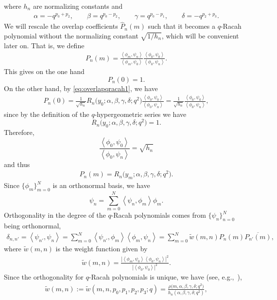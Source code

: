 \documentclass[10pt,a4paper]{amsart}
\numberwithin{equation}{section}
\newcommand{\inprod}[2]{\left\langle #1, #2 \right\rangle}
\begin{document}
where $h_n$ are normalizing constants and
\begin{gather}
	\alpha=-q^{p_0+p_2},\qquad \beta=q^{p_0-p_2},\qquad \gamma=q^{p_0-p_1},\qquad \delta=-q^{p_2+p_3}. \label{eq:qracahpar}
\end{gather}
We will rescale the overlap coefficients $\widehat{P}_n(m)$ such that it becomes a $q$-Racah polynomial without the normalizing constant $\sqrt{1/h_n}$, which will be convenient later on. That is, we define
\begin{gather}
	P_n(m)=\frac{\inprod{\phi_m}{\psi_n}}{\inprod{\phi_m}{\psi_0}} \frac{\inprod{\phi_0}{\psi_0}}{\inprod{\phi_0}{\psi_n}}.\label{eq:overlap}
\end{gather}
This gives on the one hand
\[
P_n(0)=1.
\]
On the other hand, by \eqref{eq:overlapqracah1}, we have
\begin{gather*}
P_n(0)=\frac{1}{\sqrt{h_n}} R_n\big(y_0;\alpha,\beta,\gamma,\delta;q^2\big)\frac{\inprod{\phi_0}{\psi_0}}{\inprod{\phi_0}{\psi_n}}= \frac{1}{\sqrt{h_n}} \frac{\inprod{\phi_0}{\psi_0}}{\inprod{\phi_0}{\psi_n}},
\end{gather*}
since by the definition of the $q$-hypergeometric series we have
\[
R_n\big(y_0;\alpha,\beta,\gamma,\delta;q^2\big)=1.
\]
Therefore,
\[
\frac{\inprod{\phi_0}{\psi_0}}{\inprod{\phi_0}{\psi_n}} = \sqrt{h_n}
\]
and thus
\begin{gather*}
	P_n(m)=R_n\big(y_m;\alpha,\beta,\gamma,\delta;q^2\big). %
\end{gather*}
Since $\{\phi_m\}_{m=0}^N$ is an orthonormal basis, we have
\[
\psi_n=\sum_{m=0}^N\inprod{\psi_n}{\phi_m}\phi_m.
\]
Orthogonality in the degree of the $q$-Racah polynomials comes from $\{\psi_n\}_{n=0}^N$ being orthonormal,
\begin{gather}
	\delta_{n,n'}=\inprod{\psi_{n'}}{\psi_n}=\sum_{m=0}^N \inprod{\psi_{n'}}{\phi_m}\inprod{\phi_m}{\psi_n} = \sum_{m=0}^N \tilde{w}(m,n)P_n(m)\overline{P_{n'}(m)},\label{eq:orthogonalityqracah}
\end{gather}
where $\tilde{w}(m,n)$ is the weight function given by
\begin{gather*}%
	\tilde{w}(m,n)=\frac{|\inprod{\phi_m}{\psi_0}\inprod{\phi_0}{\psi_n}|^2}{|\inprod{\phi_0}{\psi_0}|^2}.
\end{gather*}
Since the orthogonality for $q$-Racah polynomials is unique, we have (see, e.g.,~\cite{KLS}),
\begin{gather}
	\tilde{w}(m,n):=\tilde{w}(m,n,p_0,p_1,p_2,p_3;q)=\frac{\rho\big(m,\alpha,\beta,\gamma,\delta;q^2\big)}{h_n(\alpha,\beta,\gamma,\delta;q^2)},\label{eq:weighttilde}
\end{gather}
\end{document}
